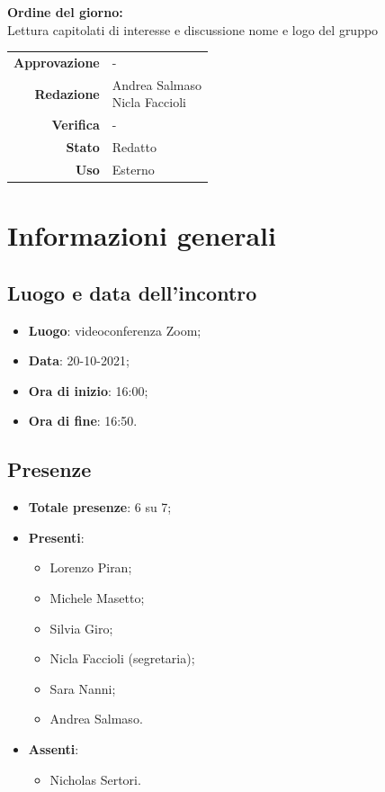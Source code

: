 \documentclass[11pt]{article}
\begin{document}
\begin{titlepage}
\begin{center}
			\large
			
			\vfill
			\textbf{Ordine del giorno:} \\
			Lettura capitolati di interesse e discussione nome e logo del gruppo
			\vfill
			
			\begin{tabular}{r|l}
				\textbf{Approvazione} &  -\\
				\textbf{Redazione} &  \parbox[t]{3.5cm}{Andrea Salmaso \\Nicla Faccioli}\\
				\textbf{Verifica} &  -\\
				\textbf{Stato} & Redatto \\
				\textbf{Uso} & Esterno
			\end{tabular}
			\vfill
			
		\end{center}
	\end{titlepage}

	\newpage

	\section{Informazioni generali}
	\subsection{Luogo e data dell'incontro}
	\begin{itemize}
		\item \textbf{Luogo}: videoconferenza Zoom;
		\item \textbf{Data}: 20-10-2021;
		\item \textbf{Ora di inizio}: 16:00;
		\item \textbf{Ora di fine}: 16:50.
	\end{itemize}
	
	\subsection{Presenze}
	\begin{itemize}
		\item \textbf{Totale presenze}: 6 su 7;
		\item \textbf{Presenti}:
		\begin{itemize}
			\item Lorenzo Piran; 
			\item Michele Masetto;
			\item Silvia Giro;
			\item Nicla Faccioli (segretaria);
			\item Sara Nanni;
			\item Andrea Salmaso.
			
		\end{itemize}
		\item \textbf{Assenti}:
			\begin{itemize}
				\item Nicholas Sertori.
			\end{itemize}
	\end{itemize}
	
\end{document}
